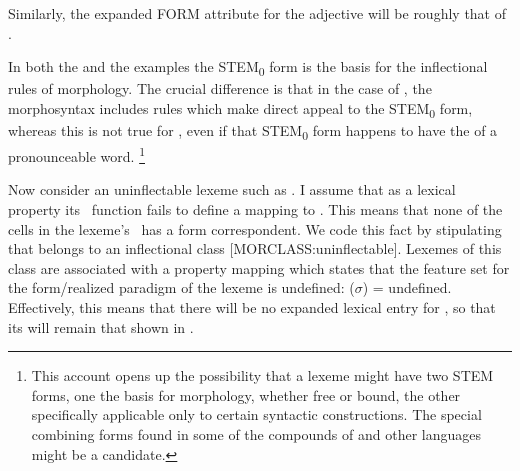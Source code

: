 \documentclass[output=paper,colorlinks,citecolor=brown]{langscibook}
\begin{document}
\ea\label{dominusform2}

\z
Similarly, the expanded FORM attribute for the  adjective  will be roughly that of .

\ea\label{kleinform}


\z
In both the  and the  examples the STEM\textsubscript{0} form is the basis for the inflectional rules of morphology. The crucial difference is that in the case of , the  morphosyntax includes rules which make direct appeal to the STEM\textsubscript{0} form, whereas this is not true for , even if that STEM\textsubscript{0} form happens to have the  of a pronounceable word.%
\footnote{%
	This account opens up the possibility that a lexeme might have two STEM forms, one the basis for morphology, whether free or bound, the other specifically applicable only to certain syntactic constructions. The special combining forms found in some of the compounds of  \citep{nublingszczepaniak2013} and other languages might be a candidate. 
}

Now consider  an uninflectable lexeme such as  . I assume that as a lexical property its \Corr\ function fails to define a mapping to \PF. This means that none of the cells in the lexeme's \PC\ has a form correspondent.  We code this fact by stipulating that  belongs to an inflectional class \mbox{[MORCLASS:uninflectable]}. Lexemes of this class are associated with a property mapping which states that the feature set for the form/realized paradigm of the lexeme is undefined: \propm({$\sigma$}) = undefined. Effectively, this means that there will be no  expanded lexical entry for , so that its  will remain that shown in .
\end{document}
